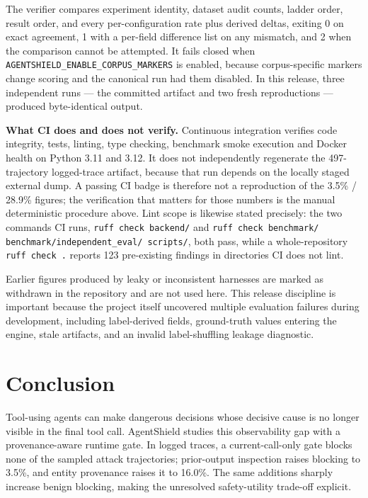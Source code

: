 \documentclass[letterpaper,twocolumn,10pt]{article}
\begin{document}
The verifier compares experiment identity, dataset audit counts, ladder order,
result order, and every per-configuration rate plus derived deltas, exiting 0 on
exact agreement, 1 with a per-field difference list on any mismatch, and 2 when
the comparison cannot be attempted. It fails closed when
\texttt{AGENTSHIELD\_ENABLE\_CORPUS\_MARKERS} is enabled, because
corpus-specific markers change scoring and the canonical run had them disabled.
In this release, three independent runs --- the committed artifact and two fresh
reproductions --- produced byte-identical output.

\noindent\textbf{What CI does and does not verify.} Continuous integration
verifies code integrity, tests, linting, type checking, benchmark smoke
execution and Docker health on Python 3.11 and 3.12. It does not independently
regenerate the 497-trajectory logged-trace artifact, because that run depends
on the locally staged external dump. A passing CI badge is therefore not a
reproduction of the 3.5\% / 28.9\% figures; the verification that matters for
those numbers is the manual deterministic procedure above. Lint scope is
likewise stated precisely: the two commands CI runs, \texttt{ruff check
backend/} and \texttt{ruff check benchmark/}
\texttt{benchmark/independent\_eval/ scripts/}, both pass, while a
whole-repository \texttt{ruff check .} reports 123 pre-existing findings in
directories CI does not lint.

Earlier figures produced by leaky or inconsistent harnesses are marked as
withdrawn in the repository and are not used here. This release discipline is
important because the project itself uncovered multiple evaluation failures
during development, including label-derived fields, ground-truth values entering
the engine, stale artifacts, and an invalid label-shuffling leakage diagnostic.

\section{Conclusion}
\label{sec:conclusion}

Tool-using agents can make dangerous decisions whose decisive cause is no longer
visible in the final tool call. AgentShield studies this observability gap with
a provenance-aware runtime gate. In logged traces, a current-call-only gate
blocks none of the sampled attack trajectories; prior-output inspection raises
blocking to 3.5\%, and entity provenance raises it to 16.0\%. The same additions
sharply increase benign blocking, making the unresolved safety-utility trade-off
explicit.
\end{document}
